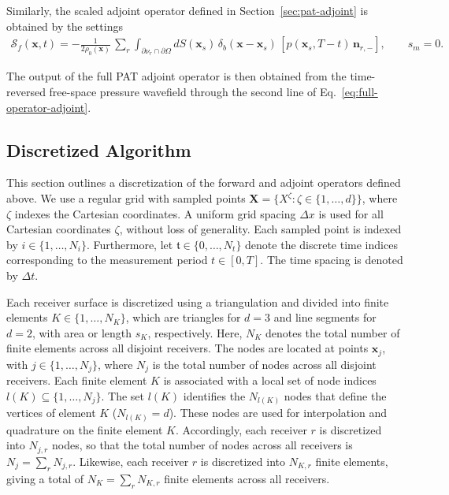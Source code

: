 \documentclass[11pt,reqno]{amsart}
\theoremstyle{remark}
\newcommand{\bx}{\boldsymbol{x}}
\newcommand{\bn}{\boldsymbol{n}}
\newcommand{\bt}{\mathfrak{t}}
\begin{document}
Similarly, the scaled adjoint operator defined in Section~\ref{sec:pat-adjoint} is obtained by the settings \cite{Javaherian2022}
\begin{align}
\boldsymbol{\mathcal{S}}_f(\bx, t)
=
- \frac{1}{2 \rho_0(\bx)} \, \sum_r
\int_{\partial\nu_r \cap \partial\Omega}
dS(\bx_s)\,
\delta_b(\bx - \bx_s)\,
\left[p(\bx_s, T - t)\,\bn_{r,-} \right],
\qquad
s_m = 0.
\end{align}

The output of the full PAT adjoint operator is then obtained from the time-reversed free-space pressure wavefield through the second line of Eq.~\eqref{eq:full-operator-adjoint}.





\subsection{Discretized Algorithm}

This section outlines a discretization of the forward and adjoint operators defined above. We use a regular grid with sampled points \( \mathbf{X} = \{X^\zeta : \zeta \in \{1,\ldots,d\}\} \), where \( \zeta \) indexes the Cartesian coordinates. A uniform grid spacing \( \Delta x \) is used for all Cartesian coordinates \( \zeta \), without loss of generality. Each sampled point is indexed by \( i \in \{1,\ldots,N_i\} \). Furthermore, let \( \bt \in \{0,\ldots,N_t\} \) denote the discrete time indices corresponding to the measurement period \( t \in [0,T] \). The time spacing is denoted by \(\Delta t\).

Each receiver surface is discretized using a triangulation and divided into finite elements \(K \in \{1,\ldots,N_K\}\), which are triangles for \(d=3\) and line segments for \(d=2\), with area or length \(s_K\), respectively. Here, \(N_K\) denotes the total number of finite elements across all disjoint receivers. The nodes are located at points \(\bx_j\), with \(j \in \{1,\ldots,N_j\}\), where \(N_j\) is the total number of nodes across all disjoint receivers. Each finite element \(K\) is associated with a local set of node indices \( l(K) \subseteq \{1,\ldots,N_j\} \). The set \( l(K) \) identifies the \( N_{l(K)} \) nodes that define the vertices of element \(K\) (\(N_{l(K)} = d\)). These nodes are used for interpolation and quadrature on the finite element \(K\). Accordingly, each receiver \(r\) is discretized into \(N_{j,r}\) nodes, so that the total number of nodes across all receivers is \(N_j = \sum_r N_{j,r}\). Likewise, each receiver \(r\) is discretized into \(N_{K,r}\) finite elements, giving a total of \(N_K = \sum_r N_{K,r}\) finite elements across all receivers.
\end{document}

